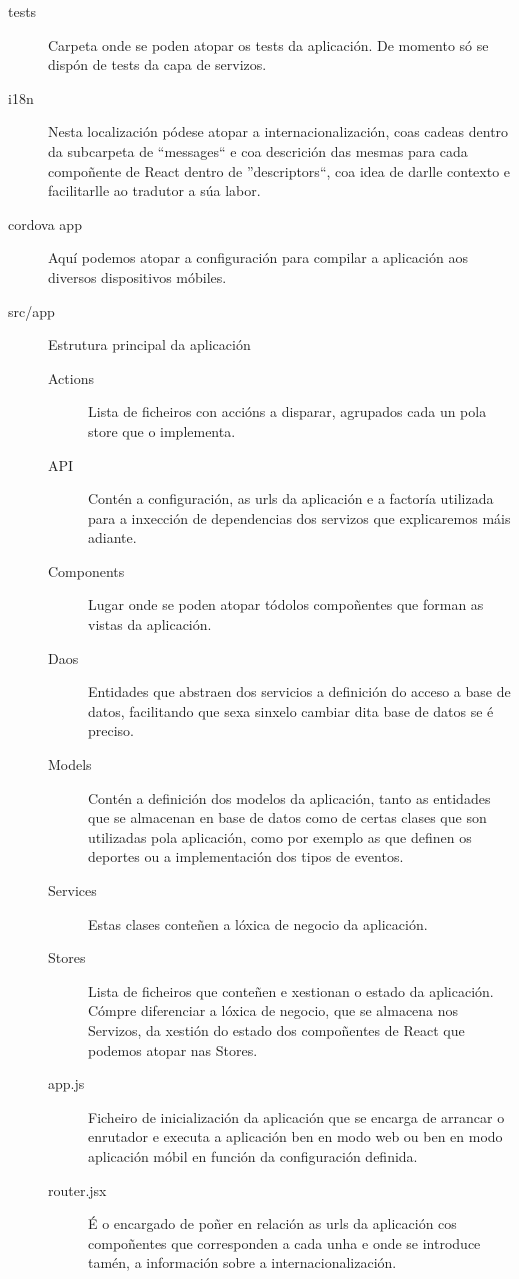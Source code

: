       \begin{description}
        \item [tests] Carpeta onde se poden atopar os tests da aplicación. De 
momento só se dispón de tests da capa de servizos.
        \item [i18n] Nesta localización pódese atopar a internacionalización, 
coas cadeas dentro da subcarpeta de ``messages`` e coa descrición das mesmas 
para cada compoñente de React dentro de ''descriptors``, coa idea de darlle 
contexto e facilitarlle ao tradutor a súa labor.
        \item [cordova app] Aquí podemos atopar a configuración para compilar a 
aplicación aos diversos dispositivos móbiles.
        \item [src/app] Estrutura principal da aplicación
        \begin{description}
          \item [Actions] Lista de ficheiros con accións a disparar, agrupados 
cada un pola store que o implementa.
          \item [API] Contén a configuración, as urls da aplicación e a 
factoría utilizada para a inxección de dependencias dos servizos que 
explicaremos máis adiante.
          \item [Components] Lugar onde se poden atopar tódolos compoñentes 
que forman as vistas da aplicación. 
          \item [Daos] Entidades que abstraen dos servicios a definición do 
acceso a base de datos, facilitando que sexa sinxelo cambiar dita base de datos 
se é preciso.
          \item [Models] Contén a definición dos modelos da aplicación, tanto as 
entidades que se almacenan en base de datos como de certas clases que son 
utilizadas pola aplicación, como por exemplo as que definen os deportes ou a 
implementación dos tipos de eventos.
          \item [Services] Estas clases conteñen a lóxica de negocio da 
aplicación.
          \item [Stores] Lista de ficheiros que conteñen e xestionan o estado da 
aplicación. Cómpre diferenciar a lóxica de negocio, que se almacena nos 
Servizos, da xestión do estado dos compoñentes de React que podemos atopar nas 
Stores.
          \item [app.js] Ficheiro de inicialización da aplicación que se encarga 
de arrancar o enrutador e executa a aplicación ben en modo web ou ben en modo 
aplicación móbil en función da configuración definida.
          \item [router.jsx] É o encargado de poñer en relación as urls da 
aplicación cos compoñentes que corresponden a cada unha e onde se introduce 
tamén, a información sobre a internacionalización.

        \end{description}

      \end{description}


